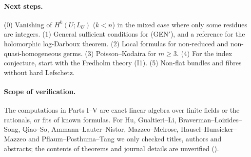 \paragraph{Next steps.} (0) Vanishing of $H^k(U;L_U)$ ($k<n$) in the mixed case where only some residues are integers. (1) General sufficient conditions for (GEN$'$), and a reference for the holomorphic log-Darboux theorem. (2) Local formulas for non-reduced and non-quasi-homogeneous germs. (3) Poisson--Kodaira for $m\ge3$. (4) For the index conjecture, start with the Fredholm theory (I1). (5) Non-flat bundles and fibres without hard Lefschetz.

\paragraph{Scope of verification.} The computations in Parts I--V are exact linear algebra over finite fields or the rationals, or fits of known formulas. For Hu, Gualtieri--Li, Braverman--Loizides--Song, Qiao--So, Ammann--Lauter--Nistor, Mazzeo--Melrose, Hausel--Hunsicker--Mazzeo and Pflaum--Posthuma--Tang we only checked titles, authors and abstracts; the contents of theorems and journal details are unverified (\tQ).

